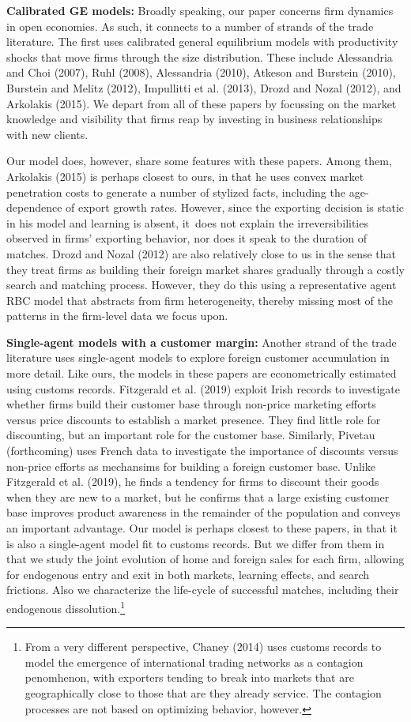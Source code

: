 \documentclass[12pt]{article}
\begin{document}
\textbf{Calibrated GE models:} Broadly speaking, our paper concerns firm
dynamics in open economies. As such, it connects to a number of strands of
the trade literature. The first uses calibrated general equilibrium models
with productivity shocks that move firms through the size distribution.
These include Alessandria and Choi (2007), Ruhl (2008), Alessandria (2010),
Atkeson and Burstein (2010), Burstein and Melitz (2012), Impullitti et al.
(2013), Drozd and Nozal (2012), and Arkolakis (2015). We depart from all of
these papers by focussing on the market knowledge and visibility that firms
reap by investing in business relationships with new clients.

Our model does, however, share some features with these papers. Among them,
Arkolakis (2015) is perhaps closest to ours, in that he uses convex market
penetration costs to generate a number of stylized facts, including the
age-dependence of export growth rates. However, since the exporting decision
is static in his model and learning is absent, it\ does not explain the
irreversibilities observed in firms' exporting behavior, nor does it speak
to the duration of matches. Drozd and Nozal (2012) are also relatively close
to us in the sense that they treat firms as building their foreign market
shares gradually through a costly search and matching process. However, they
do this using a representative agent RBC model that abstracts from firm
heterogeneity, thereby missing most of the patterns in the firm-level data
we focus upon.

\textbf{Single-agent models with a customer margin:} Another strand of the
trade literature uses single-agent models to explore foreign customer
accumulation in more detail. Like ours, the models in these papers are
econometrically estimated using customs records. Fitzgerald et al. (2019)
exploit Irish records to investigate whether firms build their customer base
through non-price marketing efforts versus price discounts to establish a
market presence. They find little role for discounting, but an important
role for the customer base. Similarly, Pivetau (forthcoming) uses French
data to investigate the importance of discounts versus non-price efforts as
mechansims for building a foreign customer base. Unlike Fitzgerald et al.
(2019), he finds a tendency for firms to discount their goods when they are
new to a market, but he confirms that a large existing customer base
improves product awareness in the remainder of the population and conveys an
important advantage. Our model is perhaps closest to these papers, in that
it is also a single-agent model fit to customs records. But we differ from
them in that we study the joint evolution of home and foreign sales for each
firm, allowing for endogenous entry and exit in both markets, learning
effects, and search frictions. Also we characterize the life-cycle of
successful matches, including their endogenous dissolution.\footnote{%
From a very different perspective, Chaney (2014) uses customs records to
model the emergence of international trading networks as a contagion
penomhenon, with exporters tending to break into markets that are
geographically close to those that are they already service. The contagion
processes are not based on optimizing behavior, however.}
\end{document}
